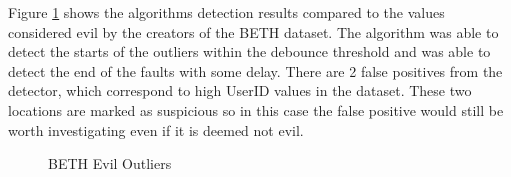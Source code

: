Figure \ref{fig:beth_evil_outliers} shows the algorithms detection results compared to the values considered evil by the creators of the BETH dataset. The algorithm was able to detect the starts of the outliers within the debounce threshold and was able to detect the end of the faults with some delay. There are 2 false positives from the detector, which correspond to high UserID values in the dataset. These two locations are marked as suspicious so in this case the false positive would still be worth investigating even if it is deemed not evil.
 
\begin{figure}[H]
    
    \caption{BETH Evil Outliers}
    \label{fig:beth_evil_outliers}
\end{figure}

